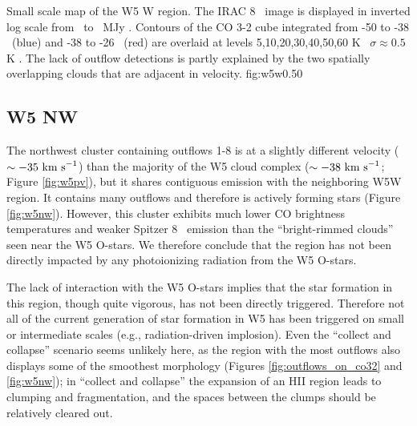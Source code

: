


{Small scale map of the W5 W region.  The IRAC 8 \um\ image is displayed in
inverted log scale from \lowirac\ to \highirac\ MJy \persr.  Contours of the CO
3-2 cube integrated from -50 to -38 \kms\ (blue) and -38 to -26 \kms\ (red) are
overlaid at levels 5,10,20,30,40,50,60 K \kms\ $\sigma\approx0.5$ K \kms.  The
lack of outflow detections is partly explained by the two spatially overlapping
clouds that are adjacent in velocity.
}{fig:w5w}{0.5}{0}


\subsection{W5 NW}
The northwest cluster  containing outflows 1-8 is at a
slightly different velocity ($\sim-35~\textrm{km~s}^{-1}$) than the majority of the W5 cloud
complex ($\sim-38~\textrm{km~s}^{-1}$; Figure \ref{fig:w5pv}), but it shares contiguous
emission with the neighboring W5W region.  %
It contains many outflows and therefore is actively forming stars  (Figure
\ref{fig:w5nw}).  However, this cluster exhibits much lower CO brightness
temperatures and weaker Spitzer 8 \um\ emission than the ``bright-rimmed
clouds'' seen near the W5 O-stars. We therefore conclude that the region has
not been directly impacted by any photoionizing radiation from the W5 O-stars.

The lack of interaction with the W5 O-stars implies that the star formation in
this region, though quite vigorous, has not been directly triggered.  Therefore
not all of the current generation of star formation in W5 has been triggered on
small or intermediate scales (e.g., radiation-driven implosion).  Even the
``collect and collapse'' scenario seems unlikely here, as the region with the
most outflows also displays some of the smoothest morphology (Figures
\ref{fig:outflows_on_co32} and \ref{fig:w5nw}); in ``collect and collapse'' the
expansion of an HII region leads to clumping and fragmentation, and the spaces
between the clumps should be relatively cleared out.

